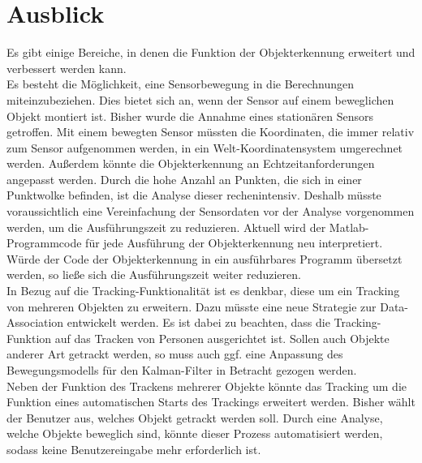 \section{Ausblick}\label{sec:Ausblick}
Es gibt einige Bereiche, in denen die Funktion der Objekterkennung erweitert und verbessert werden kann.\\
Es besteht die Möglichkeit, eine Sensorbewegung in die Berechnungen miteinzubeziehen. Dies bietet sich an, wenn der Sensor auf einem beweglichen Objekt montiert ist. Bisher wurde die Annahme eines stationären Sensors getroffen. Mit einem bewegten Sensor müssten die Koordinaten, die immer relativ zum Sensor aufgenommen werden, in ein Welt-Koordinatensystem umgerechnet werden.
Außerdem könnte die Objekterkennung an Echtzeitanforderungen angepasst werden. Durch die hohe Anzahl an Punkten, die sich in einer Punktwolke befinden, ist die Analyse dieser rechenintensiv. Deshalb müsste voraussichtlich eine Vereinfachung der Sensordaten vor der Analyse vorgenommen werden, um die Ausführungszeit zu reduzieren. Aktuell wird der Matlab-Programmcode für jede Ausführung der Objekterkennung neu interpretiert. Würde der Code der Objekterkennung in ein ausführbares Programm übersetzt werden, so ließe sich die Ausführungszeit weiter reduzieren.\\
In Bezug auf die Tracking-Funktionalität ist es denkbar, diese um ein Tracking von mehreren Objekten zu erweitern. Dazu müsste eine neue Strategie zur Data-Association entwickelt werden. Es ist dabei zu beachten, dass die Tracking-Funktion auf das Tracken von Personen ausgerichtet ist. Sollen auch Objekte anderer Art getrackt werden, so muss auch ggf. eine Anpassung des Bewegungsmodells für den Kalman-Filter in Betracht gezogen werden.\\
Neben der Funktion des Trackens mehrerer Objekte könnte das Tracking um die Funktion eines automatischen Starts des Trackings erweitert werden. Bisher wählt der Benutzer aus, welches Objekt getrackt werden soll. Durch eine Analyse, welche Objekte beweglich sind, könnte dieser Prozess automatisiert werden, sodass keine Benutzereingabe mehr erforderlich ist.
 